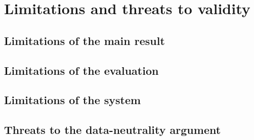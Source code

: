 \section{Limitations and threats to validity}
\label{sec:limitations}

\subsection{Limitations of the main result}

\subsection{Limitations of the evaluation}

\subsection{Limitations of the system}

\subsection{Threats to the data-neutrality argument}


